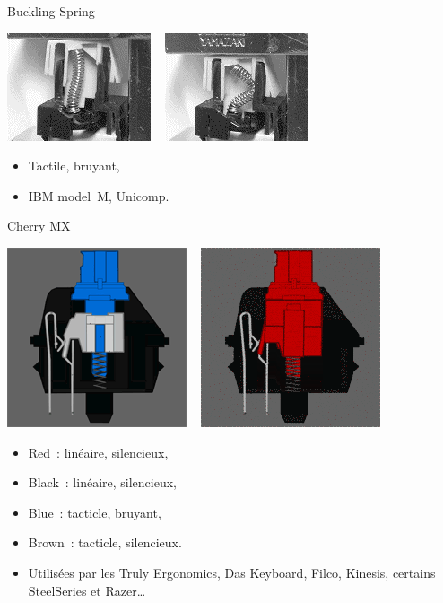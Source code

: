 \begin{frame}{Buckling Spring}
	\begin{center}
		\includegraphics[scale=0.8]{images/hard_buckling} ~
		\includegraphics[scale=0.8]{images/hard_buckling2}
	\end{center}
	\begin{itemize}
		\item Tactile, bruyant,
		\item IBM model~M, Unicomp.
	\end{itemize}
\end{frame}

\begin{frame}{Cherry MX}
	\begin{center}
		\includegraphics[scale=0.5]{images/hard_cherryblue} ~
		\includegraphics[scale=0.5]{images/hard_cherryred}
	\end{center}
	\begin{itemize}
		\item Red~: linéaire, silencieux,
		\item Black~: linéaire, silencieux,
		\item Blue~: tacticle, bruyant,
		\item Brown~: tacticle, silencieux.
		\item Utilisées par les Truly Ergonomics, Das Keyboard, Filco, Kinesis,
		certains SteelSeries et Razer\dots
	\end{itemize}
\end{frame}

